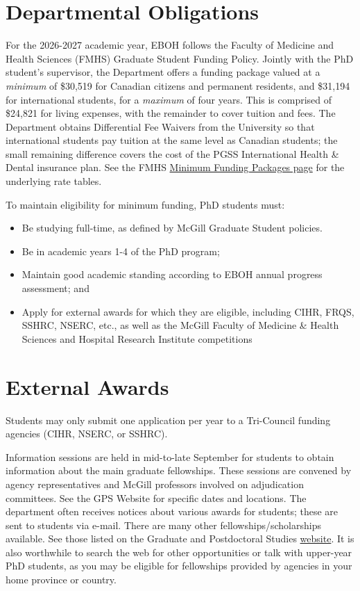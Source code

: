 \documentclass[
  letterpaper,
  DIV=11,
  numbers=noendperiod]{scrreprt}
\providecommand{\tightlist}{%
  \setlength{\itemsep}{0pt}\setlength{\parskip}{0pt}}
\begin{document}
\section{Departmental Obligations}\label{departmental-obligations}

For the 2026-2027 academic year, EBOH follows the Faculty of Medicine
and Health Sciences (FMHS) Graduate Student Funding Policy. Jointly with
the PhD student's supervisor, the Department offers a funding package
valued at a \emph{minimum} of \$30,519 for Canadian citizens and
permanent residents, and \$31,194 for international students, for a
\emph{maximum} of four years. This is comprised of \$24,821 for living
expenses, with the remainder to cover tuition and fees. The Department
obtains Differential Fee Waivers from the University so that
international students pay tuition at the same level as Canadian
students; the small remaining difference covers the cost of the PGSS
International Health \& Dental insurance plan. See the FMHS
\href{https://www.mcgill.ca/medhealthsci-gradstudies/fmhs-graduate-student-funding-policy/minimum-funding-packages-fmhs-graduate-programs-2026-2027}{Minimum
Funding Packages page} for the underlying rate tables.

To maintain eligibility for minimum funding, PhD students must:

\begin{itemize}
\tightlist
\item
  Be studying full-time, as defined by McGill Graduate Student policies.
\item
  Be in academic years 1-4 of the PhD program;
\item
  Maintain good academic standing according to EBOH annual progress
  assessment; and
\item
  Apply for external awards for which they are eligible, including CIHR,
  FRQS, SSHRC, NSERC, etc., as well as the McGill Faculty of Medicine \&
  Health Sciences and Hospital Research Institute competitions
\end{itemize}

\section{External Awards}\label{external-awards}

Students may only submit one application per year to a Tri-Council
funding agencies (CIHR, NSERC, or SSHRC).

Information sessions are held in mid-to-late September for students to
obtain information about the main graduate fellowships. These sessions
are convened by agency representatives and McGill professors involved on
adjudication committees. See the GPS Website for specific dates and
locations. The department often receives notices about various awards
for students; these are sent to students via e-mail. There are many
other fellowships/scholarships available. See those listed on the
Graduate and Postdoctoral Studies
\href{https://www.mcgill.ca/gps/funding/opportunities/phd}{website}. It
is also worthwhile to search the web for other opportunities or talk
with upper-year PhD students, as you may be eligible for fellowships
provided by agencies in your home province or country.
\end{document}
